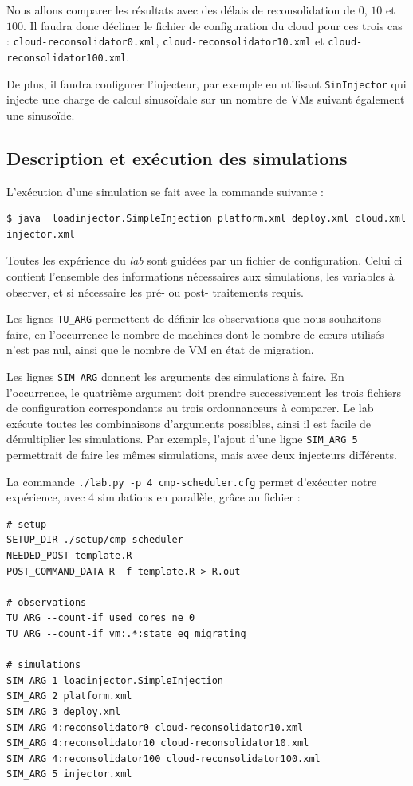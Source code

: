 \documentclass[parallelisme]{compas2017}
\newcommand\smalltt[1]{\texttt{\small #1}}
\begin{document}
Nous allons comparer les résultats avec des délais de reconsolidation de $0$, 
$10$ et $100$. Il faudra donc décliner le fichier de configuration du cloud 
pour ces trois cas : \smalltt{cloud-reconsolidator0.xml}, 
\smalltt{cloud-reconsolidator10.xml} et \smalltt{cloud-reconsolidator100.xml}. 

De plus, il faudra configurer l'injecteur, par exemple en utilisant 
\smalltt{SinInjector} qui injecte une charge de calcul sinusoïdale sur un nombre 
de VMs suivant également une sinusoïde.


\subsection{Description et exécution des simulations}

L'exécution d'une simulation se fait avec la commande suivante : 
\begin{lstlisting}
$ java  loadinjector.SimpleInjection platform.xml deploy.xml cloud.xml
injector.xml
\end{lstlisting}

Toutes les expérience du \emph{lab} sont guidées par un fichier de 
configuration. Celui ci contient l'ensemble des informations nécessaires aux 
simulations, les variables à observer, et si nécessaire les pré- ou post- 
traitements requis. 

Les lignes \smalltt{TU\_ARG} permettent de définir les observations que nous 
souhaitons faire, en l'occurrence le nombre de machines dont le nombre de cœurs 
utilisés n'est pas nul, ainsi que le nombre de VM en état de migration.

Les lignes \smalltt{SIM\_ARG} donnent les arguments des simulations à faire. 
En l'occurrence, le quatrième argument doit prendre successivement les trois 
fichiers de configuration correspondants au trois ordonnanceurs à comparer. 
Le lab exécute toutes les combinaisons d'arguments possibles, ainsi il est 
facile de démultiplier les simulations. Par exemple, l'ajout d'une ligne 
\smalltt{SIM\_ARG 5} permettrait de faire les mêmes simulations, mais avec 
deux injecteurs différents.

La commande \smalltt{./lab.py -p 4 cmp-scheduler.cfg} permet d'exécuter 
notre expérience, avec 4 simulations en parallèle, grâce au fichier :

\begin{lstlisting}
# setup
SETUP_DIR ./setup/cmp-scheduler
NEEDED_POST template.R
POST_COMMAND_DATA R -f template.R > R.out

# observations
TU_ARG --count-if used_cores ne 0
TU_ARG --count-if vm:.*:state eq migrating

# simulations
SIM_ARG 1 loadinjector.SimpleInjection
SIM_ARG 2 platform.xml 
SIM_ARG 3 deploy.xml
SIM_ARG 4:reconsolidator0 cloud-reconsolidator10.xml
SIM_ARG 4:reconsolidator10 cloud-reconsolidator10.xml 
SIM_ARG 4:reconsolidator100 cloud-reconsolidator100.xml
SIM_ARG 5 injector.xml
\end{lstlisting}
\end{document}
